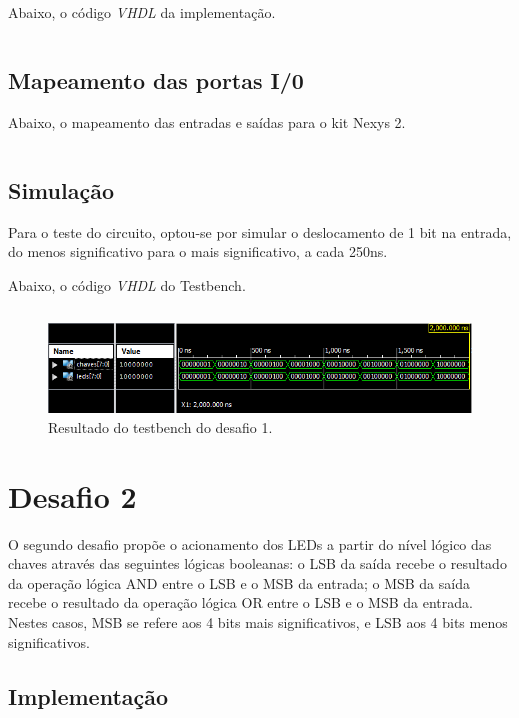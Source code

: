 \documentclass[12pt]{article}
\begin{document}
Abaixo, o código \emph{VHDL} da implementação.

\inputminted{vhdl}{Desafio1.vhd}


\subsection{Mapeamento das portas I/0}
\label{subsec:desafio1_map}

Abaixo, o mapeamento das entradas e saídas para o kit Nexys 2.

\inputminted{vhdl}{desafio2_pins.ucf}

\subsection{Simulação}

Para o teste do circuito, optou-se por simular o deslocamento de 1 bit na entrada, do menos significativo para o mais significativo, a cada 250ns.

Abaixo, o código \emph{VHDL} do Testbench.

\inputminted{vhdl}{tb_desafio1.vhd}

\begin{figure}[!h]
    \centering
    \includegraphics[width=1\textwidth]{tb_1.PNG}
    \caption{Resultado do testbench do desafio 1.}
    \label{fig:desafio1}
\end{figure}

\clearpage

\section{Desafio 2}

O segundo desafio propõe o acionamento dos LEDs a partir do nível lógico das chaves através das seguintes lógicas booleanas: o LSB da saída recebe o resultado da operação lógica AND entre o LSB e o MSB da entrada; o MSB da saída recebe o resultado da operação lógica OR entre o LSB e o MSB da entrada. Nestes casos, MSB se refere aos 4 bits mais significativos, e LSB aos 4 bits menos significativos.

\subsection{Implementação}
\end{document}
